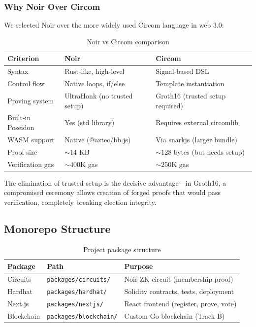 \documentclass[12pt, a4paper]{report}
\begin{document}
\subsubsection{Why Noir Over Circom}

We selected Noir over the more widely used Circom language in web 3.0:

\begin{table}[H]
\centering
\caption{Noir vs Circom comparison}
\label{tab:noir_vs_circom}
\begin{tabular}{|l|l|l|}
\hline
\textbf{Criterion} & \textbf{Noir} & \textbf{Circom} \\ \hline
Syntax & Rust-like, high-level & Signal-based DSL \\ \hline
Control flow & Native loops, if/else & Template instantiation \\ \hline
Proving system & UltraHonk (no trusted setup) & Groth16 (trusted setup required) \\ \hline
Built-in Poseidon & Yes (std library) & Requires external circomlib \\ \hline
WASM support & Native (@aztec/bb.js) & Via snarkjs (larger bundle) \\ \hline
Proof size & $\sim$14 KB & $\sim$128 bytes (but needs setup) \\ \hline
Verification gas & $\sim$400K gas & $\sim$250K gas \\ \hline
\end{tabular}
\end{table}

The elimination of trusted setup is the decisive advantage---in Groth16, a compromised ceremony allows creation of forged proofs that would pass verification, completely breaking election integrity.

\subsection{Monorepo Structure}

\begin{table}[H]
\centering
\caption{Project package structure}
\label{tab:packages}
\begin{tabular}{|l|l|p{6.5cm}|}
\hline
\textbf{Package} & \textbf{Path} & \textbf{Purpose} \\ \hline
Circuits & \texttt{packages/circuits/} & Noir ZK circuit (membership proof) \\ \hline
Hardhat & \texttt{packages/hardhat/} & Solidity contracts, tests, deployment \\ \hline
Next.js & \texttt{packages/nextjs/} & React frontend (register, prove, vote) \\ \hline
Blockchain & \texttt{packages/blockchain/} & Custom Go blockchain (Track B) \\ \hline
\end{tabular}
\end{table}
\end{document}
